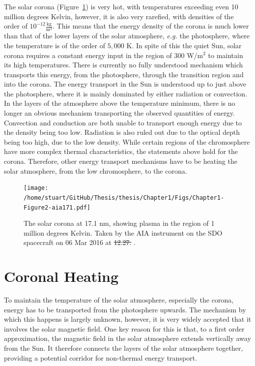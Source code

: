 \documentclass[a4paper,12pt,fourier,authoryear,custommargin]{Classes/PhDThesisPSnPDF}
\providecommand{\DIFaddtex}[1]{{\protect\color{blue}\uwave{#1}}} %
\providecommand{\DIFdeltex}[1]{{\protect\color{red}\sout{#1}}}                      %
\providecommand{\DIFaddFL}[1]{\DIFadd{#1}} %
\providecommand{\DIFdelFL}[1]{\DIFdel{#1}} %
\providecommand{\DIFaddbeginFL}{} %
\providecommand{\DIFaddendFL}{} %
\providecommand{\DIFdelbeginFL}{} %
\providecommand{\DIFdelendFL}{} %
\providecommand{\DIFadd}[1]{\texorpdfstring{\DIFaddtex{#1}}{#1}} %
\providecommand{\DIFdel}[1]{\texorpdfstring{\DIFdeltex{#1}}{}} %
\begin{document}
The solar corona (Figure~\ref{fig:aia171}) is very hot, with temperatures exceeding even 10 million degrees Kelvin, however, it is also very rarefied, with densities of the order of $10^{-12}$$\frac{\text{kg}}{\text{m}^3}$.
This means that the energy density of the corona is much lower than that of the lower layers of the solar atmosphere, \textit{e.g.} the photosphere, where the temperature is of the order of $5,000$ K.
In spite of this the quiet Sun, solar corona requires a constant energy input in the region of $300$ W/m$^2$ \citep{priest2014} to maintain its high temperatures.
There is currently no fully understood mechanism which transports this energy, from the photosphere, through the transition region and into the corona. \citep{aschwanden2007,erdelyi2007,parnell2012}
The energy transport in the Sun is understood up to just above the photosphere, where it is mainly dominated by either radiation or convection.
In the layers of the atmosphere above the temperature minimum, there is no longer an obvious mechanism transporting the observed quantities of energy.
Convection and conduction are both unable to transport enough energy due to the density being too low.
Radiation is also ruled out due to the optical depth being too high, due to the low density.
While certain regions of the chromosphere have more complex thermal characteristics, the statements above hold for the corona.
Therefore, other energy transport mechanisms have to be heating the solar atmosphere, from the low chromosphere, to the corona.




\begin{figure}[h]
    \centering
    \texttt{[image: /home/stuart/GitHub/Thesis/thesis/Chapter1/Figs/Chapter1-Figure2-aia171.pdf]}
    \caption{The solar corona at 17.1 nm, showing plasma in the region of 1 million degrees Kelvin. Taken by the AIA instrument on the SDO spacecraft on 06 Mar 2016 at \DIFdelbeginFL \DIFdelFL{12}\DIFdelendFL \DIFaddbeginFL \DIFaddFL{11}\DIFaddendFL :\DIFdelbeginFL \DIFdelFL{27. }\DIFdelendFL \DIFaddbeginFL \DIFaddFL{48. }\DIFaddendFL \citep{pesnell2012,thesunpycommunity2015a}.}
    \label{fig:aia171}
\end{figure}


\section{Coronal Heating}

To maintain the temperature of the solar atmosphere, especially the corona, energy has to be transported from the photosphere upwards.
The mechanism by which this happens is largely unknown, however, it is very widely accepted that it involves the solar magnetic field.
One key reason for this is that, to a first order approximation, the magnetic field in the solar atmosphere extends vertically away from the Sun.
It therefore connects the layers of the solar atmosphere together, providing a potential corridor for non-thermal energy transport.
\end{document}
